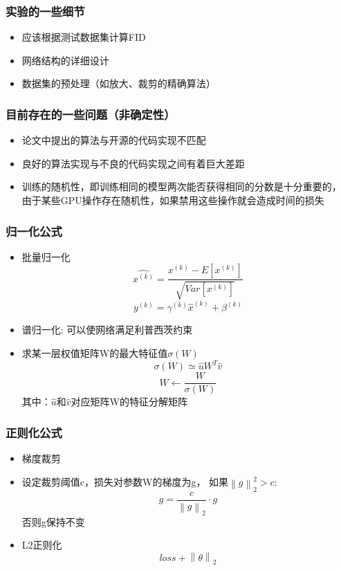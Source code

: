 \documentclass{beamer}
\begin{document}
\begin{frame}[c]\frametitle{实验的一些细节}
    \begin{itemize}
        \item 应该根据测试数据集计算FID
        \item 网络结构的详细设计
        \item 数据集的预处理（如放大、裁剪的精确算法）
    \end{itemize}
\end{frame}

\begin{frame}[c]\frametitle{目前存在的一些问题（非确定性）}
    \begin{itemize}
        \item 论文中提出的算法与开源的代码实现不匹配
        \item 良好的算法实现与不良的代码实现之间有着巨大差距
        \item 训练的随机性，即训练相同的模型两次能否获得相同的分数是十分重要的，
        由于某些GPU操作存在随机性，如果禁用这些操作就会造成时间的损失
    \end{itemize}
\end{frame}

\begin{frame}[c]\frametitle{归一化公式}
    \begin{itemize}
        \item 批量归一化
        $$\hat{x^{(k)}} = \frac{x^{(k)} - E[x^{(k)}]}{\sqrt{Var[x^{(k)}]}}$$
        $$y^{(k)} = \gamma^{(k)}\hat{x}^{(k)} + \beta^{(k)}$$
        \item 谱归一化: 可以使网络满足利普西茨约束
        \item 求某一层权值矩阵W的最大特征值$\sigma(W)$
        $$\sigma(W)\simeq\hat{u}W^T\hat{v}$$
        $$W\gets\frac{W}{\sigma(W)}$$
        其中：$\hat{u}$和$\hat{v}$对应矩阵W的特征分解矩阵
        
    \end{itemize}
\end{frame}

\begin{frame}[c]\frametitle{正则化公式}
    \begin{itemize}
        \item 梯度裁剪
        \item  
        \begin{itemize}
                设定裁剪阈值c，损失对参数W的梯度为g， 如果$\left\|g\right\|^2_2 > c$:
                $$g = \frac{c}{\left\| g\right\|_2}\cdot g$$
                否则g保持不变
        \end{itemize}
        \item L2正则化
            $$loss + \left\|\theta\right\|_2$$ 
    \end{itemize}
\end{frame}
\end{document}
